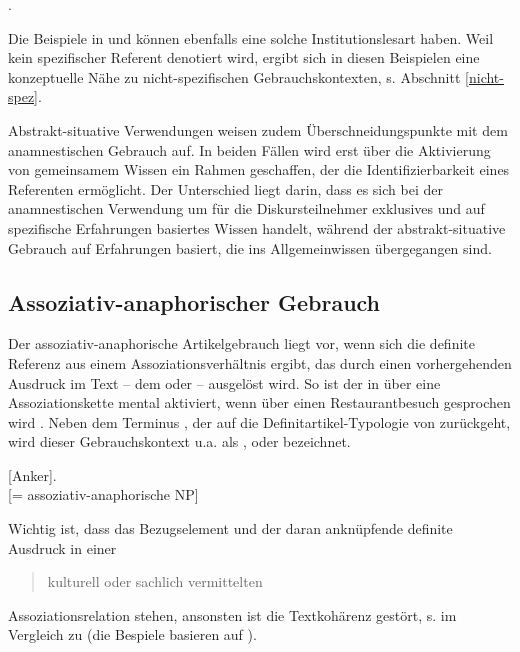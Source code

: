 \begin{exe}
	\ex \label{ex:post} .
\end{exe}

\noindent
Die Beispiele in  und  können ebenfalls eine solche Institutionslesart haben. Weil kein spezifischer Referent denotiert wird, ergibt sich in diesen Beispielen eine konzeptuelle Nähe zu nicht-spezifischen Gebrauchskontexten, s. Abschnitt \ref{nicht-spez}.

Abstrakt-situative Verwendungen weisen zudem Überschneidungspunkte mit dem anamnestischen Gebrauch \parencite[62]{Himmelmann1997} auf. In beiden Fällen wird erst über die Aktivierung von gemeinsamem Wissen ein Rahmen geschaffen, der die Identifizierbarkeit eines Referenten ermöglicht. Der Unterschied liegt darin, dass es sich bei der anamnestischen Verwendung um für die Diskursteilnehmer exklusives und auf spezifische Erfahrungen basiertes Wissen handelt, während der abstrakt-situative Gebrauch auf Erfahrungen basiert, die ins Allgemeinwissen übergegangen sind. 

\subsection{Assoziativ-anaphorischer Gebrauch}\label{sec:asso}

Der assoziativ-anaphorische Artikelgebrauch liegt vor, wenn sich die definite Referenz aus einem Assoziationsverhältnis ergibt, das durch einen vorhergehenden Ausdruck im Text -- dem  \parencite[49]{Hawkins1978} oder  \parencite[6]{Cui2014} -- ausgelöst wird. So ist der  in  über eine Assoziationskette mental aktiviert, wenn über einen Restaurantbesuch gesprochen wird \parencite[Beispiel in Anlehnung an][50]{Schwarz2000}. Neben dem Terminus , der auf die Definitartikel-Typologie von \textcite{Hawkins1978} zurückgeht, wird dieser Gebrauchskontext u.a. als  \parencite{Clark1977},  \parencite{Prince1981} oder  \parencite{Schwarz2000} bezeichnet.  

\begin{exe}
	\ex \label{ex:asso}  [Anker]. \\ [= assoziativ-anaphorische NP]  
\end{exe}
\noindent 
Wichtig ist, dass das Bezugselement und der daran anknüpfende definite Ausdruck in einer \blockcquote[36]{Himmelmann1997}{kulturell oder sachlich vermittelten} Assoziationsrelation stehen, ansonsten ist die Textkohärenz gestört, s.  im Vergleich zu  (die Bespiele basieren auf \cite[123]{Hawkins1978}).

